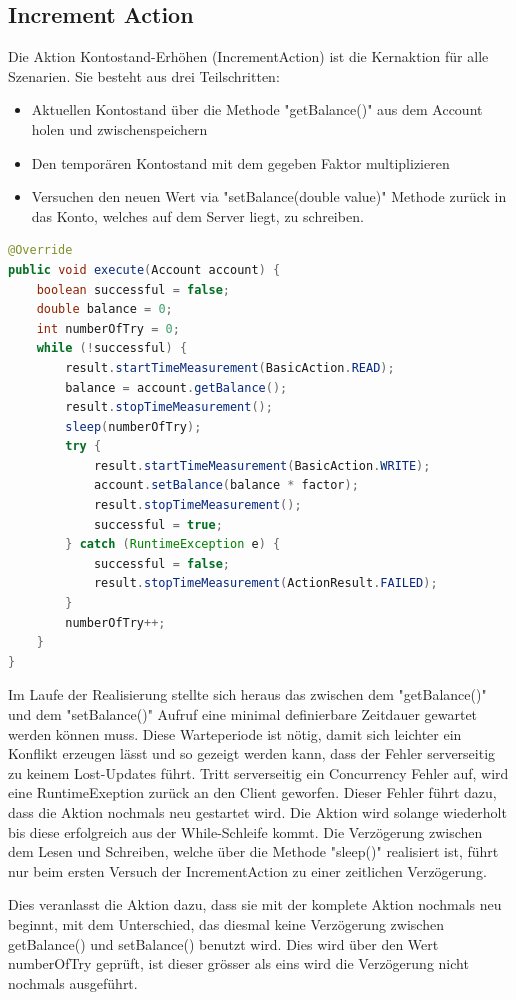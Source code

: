  
\subsection{Increment Action}
\label{sec:incrementAction}
Die Aktion Kontostand-Erhöhen (IncrementAction) ist die Kernaktion für alle Szenarien. 
Sie besteht aus drei Teilschritten:
\begin{itemize}
\item Aktuellen Kontostand über die Methode "getBalance()" aus dem Account holen und zwischenspeichern
\item Den temporären Kontostand mit dem gegeben Faktor multiplizieren
\item Versuchen den neuen Wert via "setBalance(double value)" Methode zurück in das Konto, welches auf dem Server liegt, zu schreiben. 
\end{itemize}

\begin{lstlisting}[language=java, breaklines=true] 
@Override
public void execute(Account account) {
	boolean successful = false;
	double balance = 0;
	int numberOfTry = 0;
	while (!successful) {
		result.startTimeMeasurement(BasicAction.READ);
		balance = account.getBalance();
		result.stopTimeMeasurement();
		sleep(numberOfTry);
		try {
			result.startTimeMeasurement(BasicAction.WRITE);
			account.setBalance(balance * factor);
			result.stopTimeMeasurement();
			successful = true;
		} catch (RuntimeException e) {
			successful = false;
			result.stopTimeMeasurement(ActionResult.FAILED);
		}
		numberOfTry++;
	}
}
\end{lstlisting}
Im Laufe der Rea\-li\-sie\-rung stellte sich her\-aus das zwi\-schen dem "get\-B\-alan\-ce()" und dem "set\-Ba\-lan\-ce()" Auf\-ruf eine mi\-ni\-mal de\-fi\-nier\-ba\-re Zeit\-dauer ge\-wartet werden können muss. Diese Warteperiode ist nötig, damit sich leichter ein Konflikt erzeugen lässt und so gezeigt werden kann, dass der Fehler serverseitig zu keinem Lost-Updates führt.
\newline
Tritt serverseitig ein Concurrency Fehler auf, wird eine RuntimeExeption zurück an den Client geworfen. Dieser Fehler führt dazu, dass die Aktion nochmals neu gestartet wird. Die Aktion wird solange wiederholt bis diese erfolgreich aus der While-Schleife kommt. Die Verzögerung zwischen dem Lesen und Schreiben, welche über die Methode "sleep()" realisiert ist, führt nur beim ersten Versuch der IncrementAction zu einer zeitlichen Verzögerung.


Dies veranlasst die Aktion dazu, dass sie mit der kom\-p\-le\-te Aktion noch\-mals neu beginnt, mit dem Unterschied, das diesmal keine Verzögerung zwischen getBalance() und setBalance() benutzt wird. Dies wird über den Wert numberOfTry geprüft, ist dieser grösser als eins wird die Verzögerung nicht nochmals ausgeführt.

